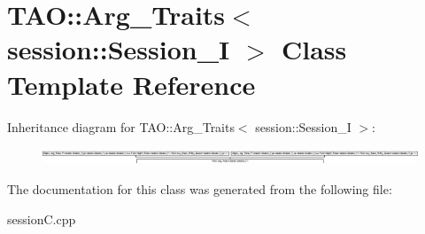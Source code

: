 \section{T\+AO\+:\+:Arg\+\_\+\+Traits$<$ session\+:\+:Session\+\_\+I $>$ Class Template Reference}
\label{classTAO_1_1Arg__Traits_3_01session_1_1Session__I_01_4}
Inheritance diagram for T\+AO\+:\+:Arg\+\_\+\+Traits$<$ session\+:\+:Session\+\_\+I $>$\+:\begin{figure}[H]
\begin{center}
\leavevmode
\includegraphics[height=0.492958cm]{classTAO_1_1Arg__Traits_3_01session_1_1Session__I_01_4}
\end{center}
\end{figure}


The documentation for this class was generated from the following file\+:\begin{DoxyCompactItemize}
\item 
session\+C.\+cpp\end{DoxyCompactItemize}
